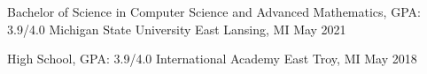 
\begin{cventries}
  \cventry
    {Bachelor of Science in Computer Science and Advanced Mathematics, GPA: 3.9/4.0} %
    {Michigan State University} %
    {East Lansing, MI} %
    {May 2021} %
    {
    }
    
  \cventry
    {High School, GPA: 3.9/4.0}
    {International Academy East}
    {Troy, MI}
    {May 2018}
    {
    }
\end{cventries}